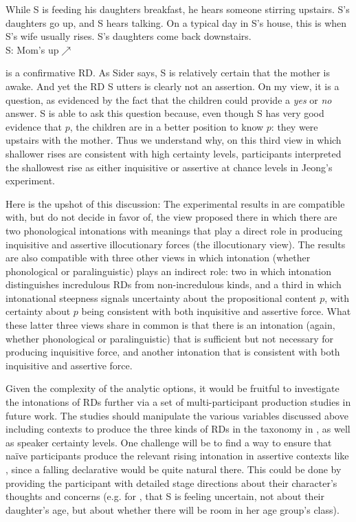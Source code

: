 \documentclass[output=paper,colorlinks,citecolor=brown]{langscibook}
\begin{document}
	\exa While S is feeding his daughters breakfast, he hears someone stirring upstairs. S's daughters go up, and S hears talking. On a typical day in S's house, this is when S's wife usually rises. S's daughters come back downstairs. \\
	S: Mom's up$\nearrow$ \label{mom}\hfill \citep{sider22}
	\z
	
	 is a confirmative RD. As Sider says, S is relatively certain that the mother is awake. And yet the RD S utters is clearly not an assertion. On my view, it is a question, as evidenced by the fact that the children could provide a \emph{yes} or \emph{no} answer. S is able to ask this question because, even though S has very good evidence that $p$, the children are in a better position to know $p$: they were upstairs with the mother. Thus we understand why, on this third view in which shallower rises are consistent with high certainty levels, participants interpreted the shallowest rise as either inquisitive or assertive at chance levels in Jeong's experiment.
	
	Here is the upshot of this discussion: The experimental results in \citet{jeong18} are compatible with, but do not decide in favor of, the view proposed there in which there are two phonological intonations with meanings that play a direct role in producing inquisitive and assertive illocutionary forces (the illocutionary view). The results are also compatible with three other views in which intonation (whether phonological or paralinguistic) plays an indirect role: two in which intonation distinguishes incredulous RDs from non-incredulous kinds, and a third in which intonational steepness signals uncertainty about the propositional content $p$, with certainty about $p$ being consistent with both inquisitive and assertive force. What these latter three views share in common is that there is an intonation (again, whether phonological or paralinguistic) that is sufficient but not necessary for producing inquisitive force, and another intonation that is consistent with both inquisitive and assertive force. 
	
	Given the complexity of the analytic options, it would be fruitful to investigate the intonations of RDs further via a set of multi-participant production studies in future work. The studies should manipulate the various variables discussed above including contexts to produce the three kinds of RDs in the taxonomy in , as well as speaker certainty levels. One challenge will be to find a way to ensure that na\"ive participants produce the relevant rising intonation in assertive contexts like , since a falling declarative would be quite natural there. This could be done by providing the participant with detailed stage directions about their character's thoughts and concerns (e.g. for , that S is feeling uncertain, not about their daughter's age, but about whether there will be room in her age group's class). 
	
\end{document}
